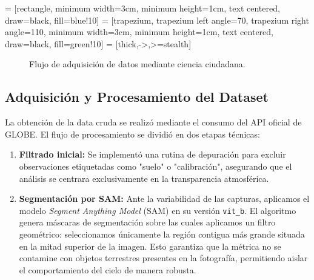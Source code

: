 \documentclass[twocolumn]{aastex701}
\begin{document}
 = [rectangle, minimum width=3cm, minimum height=1cm, text centered, draw=black, fill=blue!10]
 = [trapezium, trapezium left angle=70, trapezium right angle=110, minimum width=3cm, minimum height=1cm, text centered, draw=black, fill=green!10]
 = [thick,->,>=stealth]

\begin{figure}[h]
\centering
{}
\caption{Flujo de adquisición de datos mediante ciencia ciudadana.}
\label{fig:workflow}
\end{figure}

\subsection{Adquisición y Procesamiento del Dataset}
La obtención de la data cruda se realizó mediante el consumo del API oficial de \textsc{GLOBE}. El flujo de procesamiento se dividió en dos etapas técnicas:
\begin{enumerate}
    \item \textbf{Filtrado inicial:} Se implementó una rutina de depuración para excluir observaciones etiquetadas como "suelo" o "calibración", asegurando que el análisis se centrara exclusivamente en la transparencia atmosférica.
    \item \textbf{Segmentación por SAM:} Ante la variabilidad de las capturas, aplicamos el modelo \textit{Segment Anything Model} (SAM) en su versión \texttt{vit\_b}. El algoritmo genera máscaras de segmentación sobre las cuales aplicamos un filtro geométrico: seleccionamos únicamente la región contigua más grande situada en la mitad superior de la imagen. Esto garantiza que la métrica no se contamine con objetos terrestres presentes en la fotografía, permitiendo aislar el comportamiento del cielo de manera robusta.
\end{enumerate}
\end{document}
